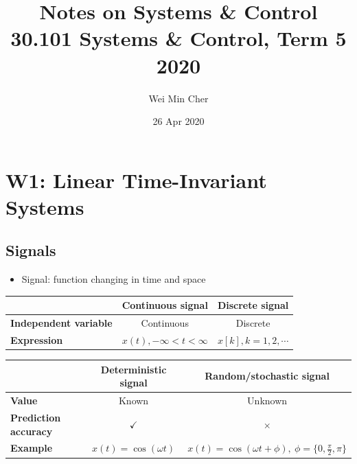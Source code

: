 \documentclass[a4paper]{article}
\begin{document}
\title{Notes on Systems \& Control\\[0.1cm]
    \large 30.101 Systems \& Control, Term 5 2020}
\author{Wei Min Cher}
\date{26 Apr 2020}

\maketitle

\tableofcontents

\newpage
\section{W1: Linear Time-Invariant Systems}
\subsection{Signals}
\begin{itemize}
    \item Signal: function changing in time and space
\end{itemize}
\begin{table}[H]
\centering
\begin{tabular}{l|c|c|}
\cline{2-3}
                                                    & \textbf{Continuous signal} & \textbf{Discrete signal} \\ \hline
\multicolumn{1}{|l|}{\textbf{Independent variable}} & Continuous                 & Discrete                 \\ \hline
\multicolumn{1}{|l|}{\textbf{Expression}}           & $x(t), -\infty<t<\infty$   & $x[k], k = 1, 2, \cdots$ \\ \hline
\end{tabular}
\end{table}
\begin{table}[H]
\centering
\begin{tabular}{l|c|c|}
\cline{2-3}
                                                   & \textbf{Deterministic signal} & \textbf{Random/stochastic signal}                              \\ \hline
\multicolumn{1}{|l|}{\textbf{Value}}               & Known                   & Unknown                                                    \\ \hline
\multicolumn{1}{|l|}{\textbf{Prediction accuracy}} & $\checkmark$                  & $\times$                                                       \\ \hline
\multicolumn{1}{|l|}{\textbf{Example}}             & $x(t) = \cos(\omega t)$       & $x(t) = \cos(\omega t+\phi), \ \phi = \{0, \frac{\pi}{2}, \pi\}$ \\ \hline
\end{tabular}
\end{table}
\end{document}

